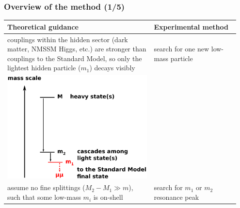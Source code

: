 \documentclass[compress]{beamer}
\begin{document}
\begin{frame}
\frametitle{Overview of the method (1/5)}

\renewcommand{\arraystretch}{1.7}
\begin{tabular}{p{0.6\linewidth} | p{0.35\linewidth}}
Theoretical guidance & Experimental method \\\hline

couplings within the hidden sector (dark matter, NMSSM Higgs, etc.) are stronger than couplings to the Standard Model, so only the lightest hidden particle ($m_1$) decays visibly & search for one new low-mass particle \\

\centering \includegraphics[width=0.8\linewidth]{basic_picture4.pdf} & \\

assume no fine splittings ($M_2 - M_1 \gg m$), such that some low-mass $m_i$ is on-shell & search for $m_1$ or $m_2$ resonance peak \\
\end{tabular}
\end{frame}
\end{document}

